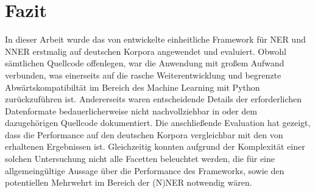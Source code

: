 

\chapter{Fazit}
\label{ch:Fazit}

In dieser Arbeit wurde das von \textcite{li2019unified} entwickelte einheitliche Framework für NER und NNER erstmalig auf deutschen Korpora angewendet und evaluiert. Obwohl  sämtlichen Quellcode offenlegen, war die Anwendung mit großem Aufwand verbunden, was einerseits auf die rasche Weiterentwicklung und begrenzte Abwärtskompatibiltät im Bereich des Machine Learning mit Python zurückzuführen ist. Andererseits waren entscheidende Details der erforderlichen Datenformate bedauerlicherweise nicht nachvollziehbar in \textcite{li2019unified} oder dem dazugehörigen Quellcode dokumentiert. Die anschließende Evaluation hat gezeigt, dass die Performance auf den deutschen Korpora vergleichbar mit den von \citeauthor{li2019unified} erhaltenen Ergebnissen ist. Gleichzeitig konnten aufgrund der Komplexität einer solchen Untersuchung nicht alle Facetten beleuchtet werden, die für eine allgemeingültige Aussage über die Performance des Frameworks, sowie den potentiellen Mehrwehrt im Bereich der (N)NER notwendig wären.

